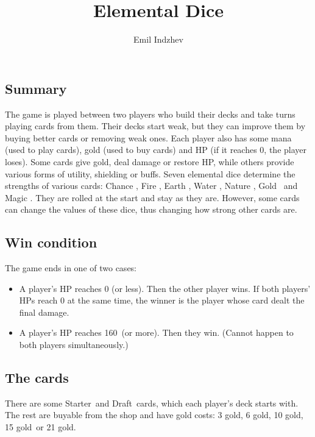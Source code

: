 \documentclass[dvipsnames,parskip,a4paper]{scrartcl}
\date{}
\title{Elemental Dice}
\author{Emil Indzhev}
\newcommand{\iconsize}{3.4mm}
\newcommand{\icondepth}{0.45mm}
\newcommand{\icon}[1]{\raisebox{-\icondepth}{\texttt{[image:  \#1 ]}}}
\newcommand{\chance}{\icon{icons/chance.png}}
\newcommand{\fire}{\icon{icons/fire.png}}
\newcommand{\earth}{\icon{icons/earth.png}}
\newcommand{\water}{\icon{icons/water.png}}
\newcommand{\nature}{\icon{icons/nature.png}}
\newcommand{\magic}{\icon{icons/magic.png}}
\newcommand{\gold}{\icon{icons/gold.png}}
\newcommand{\starter}{Starter}
\newcommand{\draft}{Draft}
\newcommand{\onecost}{3 gold}
\newcommand{\twocost}{6 gold}
\newcommand{\threecost}{10 gold}
\newcommand{\fourcost}{15 gold}
\newcommand{\fivecost}{21 gold}
\newcommand{\maxhp}{160}
\begin{document}
\maketitle

\newpage

\subsection*{Summary}

The game is played between two players who build their decks and take turns playing cards from them. Their decks start weak, but they can improve them by buying better cards or removing weak ones. Each player also has some mana (used to play cards), gold (used to buy cards) and HP (if it reaches 0, the player loses). Some cards give gold, deal damage or restore HP, while others provide various forms of utility, shielding or buffs. Seven elemental dice determine the strengths of various cards: Chance \chance, Fire \fire, Earth \earth, Water \water, Nature \nature, Gold \gold \ and Magic \magic. They are rolled at the start and stay as they are. However, some cards can change the values of these dice, thus changing how strong other cards are.

\subsection*{Win condition}

The game ends in one of two cases:

\begin{itemize}
\item A player's HP reaches 0 (or less). Then the other player wins. If both players' HPs reach 0 at the same time, the winner is the player whose card dealt the final damage.
\item A player's HP reaches \maxhp \ (or more). Then they win. (Cannot happen to both players simultaneously.)
\end{itemize}

\subsection*{The cards}

There are some \starter \ and \draft \ cards, which each player's deck starts with. The rest are buyable from the shop and have gold costs: \onecost, \twocost, \threecost, \fourcost \ or \fivecost.

\vspace{4pt}
\end{document}
